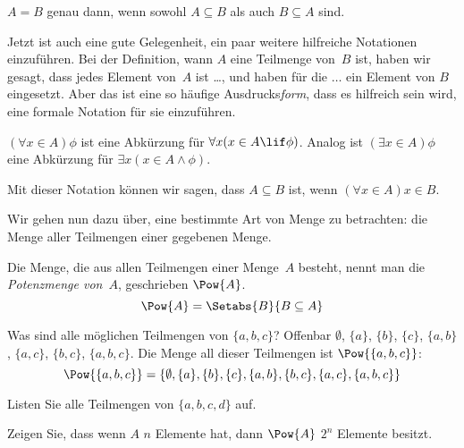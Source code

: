 \documentclass[../../../include/open-logic-section]{subfiles}
\begin{document}
\begin{prop}
$A = B$ genau dann, wenn sowohl $A \subseteq B$ als auch $B \subseteq A$ sind.
\end{prop}

Jetzt ist auch eine gute Gelegenheit, ein paar weitere
hilfreiche Notationen einzuführen. Bei der Definition, wann $A$ eine Teilmenge von~$B$ ist,
haben wir gesagt, dass
\glqq jedes Element von~$A$ ist \dots,\grqq{} und haben für die \glqq$\dots$\grqq{}
\glqq ein Element von $B$\grqq{} eingesetzt. Aber das ist eine so häufige Ausdrucks\emph{form},
dass es hilfreich sein wird, eine formale Notation für sie einzuführen.

\begin{defn}
$(\forall x \in A)\phi$ ist eine Abkürzung für $\forall x(x \in A \lif
\phi)$. Analog ist $(\exists x \in A)\phi$ eine Abkürzung für $\exists x(x
\in A \land \phi)$. 
\end{defn}

Mit dieser Notation können wir sagen, dass $A \subseteq B$ ist, wenn $(\forall
x \in A)x \in B$. 

Wir gehen nun dazu über, eine bestimmte Art von Menge zu betrachten: die Menge aller
Teilmengen einer gegebenen Menge. 

\begin{defn}[Potenzmenge]
Die Menge, die aus allen Teilmengen einer Menge~$A$ besteht, nennt man die
\emph{Potenzmenge von}~$A$, geschrieben $\Pow{A}$.
  \[
    \Pow{A} = \Setabs{B}{B \subseteq A} 
  \]
\end{defn}

\begin{ex}
Was sind alle möglichen Teilmengen von $\{ a, b, c \}$? Offenbar
$\emptyset$, $\{a \}$, $\{b\}$, $\{c\}$, $\{a, b\}$, $\{a, c\}$, $\{b,
c\}$, $\{a, b, c\}$. Die Menge all dieser Teilmengen ist
$\Pow{\{a,b,c\}}$:
\[
\Pow{\{a, b, c \}} = \{\emptyset, \{a \}, \{b\}, \{c\}, \{a, b\},
\{b, c\}, \{a, c\}, \{a, b, c\}\}
\]
\end{ex}

\begin{prob}
Listen Sie alle Teilmengen von $\{a, b, c, d\}$ auf.
\end{prob}

\begin{prob}
Zeigen Sie, dass wenn $A$ $n$ Elemente hat, dann $\Pow{A}$ $2^n$
Elemente besitzt.
\end{prob}
\end{document}
